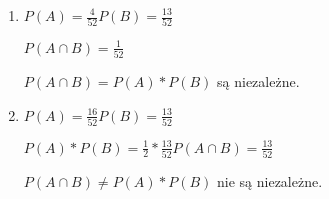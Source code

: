 \medskip
{} 
\medskip

\begin{enumerate}[label=(\alph*)]
\item
$P(A) = \frac{4}{52}  P(B) = \frac{13}{52}$

$P(A \cap B) = \frac{1}{52}$

$P(A \cap B) = P(A) * P(B)$ są niezależne.

\item
$P(A) = \frac{16}{52}  P(B) = \frac{13}{52}$

$P(A) * P(B) = \frac{1}{2} * \frac{13}{52}  P(A \cap B) = \frac{13}{52}$

$P(A \cap B) \neq P(A) * P(B)$ nie są niezależne.
\end{enumerate}